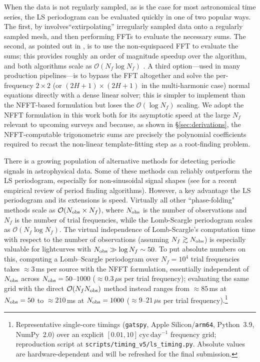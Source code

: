 \documentclass[apj]{emulateapj}
\newcommand{\bigO}{\mathcal{O}}
\begin{document}
When the data is not regularly sampled, as is the case for most astronomical time series,
the LS periodogram can be evaluated quickly in one of two popular ways.
The first, by \cite{Press+Rybicki_1989} involves``extirpolating'' irregularly sampled
data onto a regularly sampled mesh, and then performing FFTs to evaluate the necessary sums.
The second, as pointed out in \cite{Leroy_2012}, is to use the non-equispaced FFT \citep[][NFFT]{NFFT_KKD2009,NFFT_DR1993}
to evaluate the sums; this provides roughly an order of magnitude speedup over the \cite{Press+Rybicki_1989}
algorithm, and both algorithms scale as $\bigO(N_f\log N_f)$ \citep{Leroy_2012}. A third option---used in many production pipelines---is to bypass the FFT altogether and solve the per-frequency $2{\times}2$ (or $(2H{+}1){\times}(2H{+}1)$ in the multi-harmonic case) normal equations directly with a dense linear solver; this is simpler to implement than the NFFT-based formulation but loses the $\bigO(\log N_f)$ scaling. We adopt the NFFT formulation in this work both for its asymptotic speed at the large $N_f$ relevant to upcoming surveys and because, as shown in \S\ref{sec:derivations}, the NFFT-computable trigonometric sums are precisely the polynomial coefficients required to recast the non-linear template-fitting step as a root-finding problem.

There is a growing population of alternative methods for detecting
periodic signals in astrophysical data. Some of these methods can reliably
outperform the LS periodogram, especially for non-sinusoidal signal shapes
(see \cite{Graham_etal_2013} for a recent empirical review of period finding algorithms).
However, a key advantage the LS periodogram and its extensions is speed.
Virtually all other ``phase-folding" methods scale as $\bigO(N_{\rm obs}\times N_f)$, where $N_{\rm obs}$ is the number
of observations and $N_f$ is the number of trial frequencies, while the Lomb-Scargle
periodogram scales as $\bigO(N_f\log N_f)$. The virtual independence of Lomb-Scargle's computation
time with respect to the number of observations (assuming $N_f \gtrsim N_{\rm obs}$)
is especially valuable for lightcurves with $N_{\rm obs} \gg \log N_f \sim 50$.
To put absolute numbers on this, computing a Lomb--Scargle periodogram over
$N_f = 10^4$ trial frequencies takes $\approx 3$\,ms per source with the NFFT
formulation, essentially independent of $N_{\rm obs}$ across
$N_{\rm obs} = 50$--$1000$ ($\approx 0.3\,\mu$s per trial frequency); evaluating
the same grid with the direct $\bigO(N_f N_{\rm obs})$ method instead ranges from
$\approx 85$\,ms at $N_{\rm obs} = 50$ to $\approx 210$\,ms at $N_{\rm obs} = 1000$
($\approx 9$--$21\,\mu$s per trial frequency).\footnote{Representative single-core
timings (\texttt{gatspy}, Apple Silicon/\texttt{arm64}, Python~3.9, NumPy~2.0)
over an explicit $[0.01, 10]\,\mathrm{cyc\,day^{-1}}$ frequency grid; reproduction
script at \texttt{scripts/timing\_v5/ls\_timing.py}. Absolute values are
hardware-dependent and will be refreshed for the final submission.}
\end{document}
